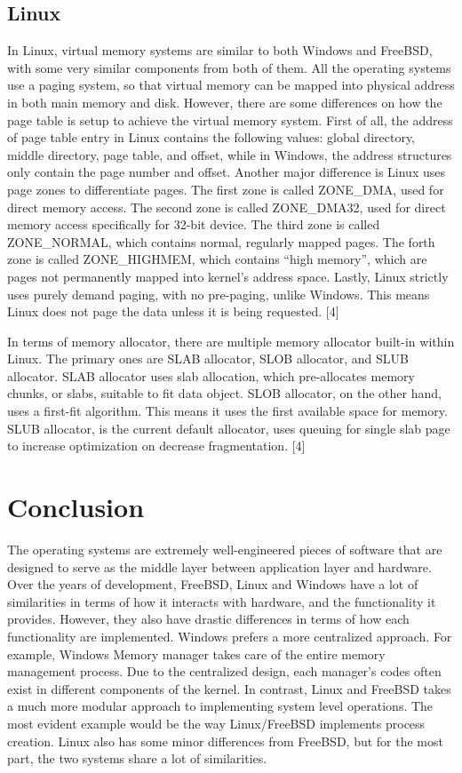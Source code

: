 \documentclass[10pt,a4paper]{article}
\begin{document}
\subsection{Linux}
In Linux, virtual memory systems are similar to both Windows and FreeBSD, with some very similar components from both of them. All the operating systems use a paging system, so that virtual memory can be mapped into physical address in both main memory and disk. However, there are some differences on how the page table is setup to achieve the virtual memory system. First of all, the address of page table entry in Linux contains the following values: global directory, middle directory, page table, and offset, while in Windows, the address structures only contain the page number and offset. Another major difference is Linux uses page zones to differentiate pages. The first zone is called ZONE\_DMA, used for direct memory access. The second zone is called ZONE\_DMA32, used for direct memory access specifically for 32-bit device. The third zone is called ZONE\_NORMAL, which contains normal, regularly mapped pages. The forth zone is called ZONE\_HIGHMEM, which contains “high memory”, which are pages not permanently mapped into kernel’s address space. Lastly, Linux strictly uses purely demand paging, with no pre-paging, unlike Windows. This means Linux does not page the data unless it is being requested. [4]

In terms of memory allocator, there are multiple memory allocator built-in within Linux. The primary ones are SLAB allocator, SLOB allocator, and SLUB allocator. SLAB allocator uses slab allocation, which pre-allocates memory chunks, or slabs, suitable to fit data object. SLOB allocator, on the other hand, uses a first-fit algorithm. This means it uses the first available space for memory. SLUB allocator, is the current default allocator, uses queuing for single slab page to increase optimization on decrease fragmentation. [4]

\section{Conclusion}
The operating systems are extremely well-engineered pieces of software that are designed to serve as the middle layer between application layer and hardware. Over the years of development, FreeBSD, Linux and Windows have a lot of similarities in terms of how it interacts with hardware, and the functionality it provides. However, they also have drastic differences in terms of how each functionality are implemented. Windows prefers a more centralized approach. For example, Windows Memory manager takes care of the entire memory management process. Due to the centralized design, each manager’s codes often exist in different components of the kernel. In contrast, Linux and FreeBSD takes a much more modular approach to implementing system level operations. The most evident example would be the way Linux/FreeBSD implements process creation. Linux also has some minor differences from FreeBSD, but for the most part, the two systems share a lot of similarities.
\end{document}
